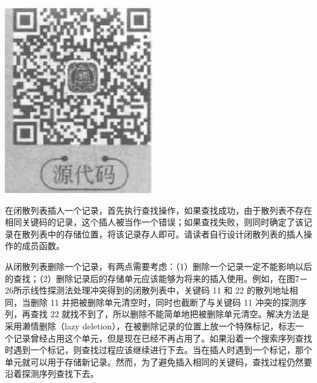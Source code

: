 \documentclass[10pt]{article}
\begin{document}
\begin{center}
\includegraphics[max width=\textwidth]{2025_06_06_704745ea57b15b2333e5g-257}
\end{center}

在闭散列表插人一个记录，首先执行查找操作，如果查找成功，由于散列表不存在相同关键码的记录，这个插人被当作一个错误；如果查找失败，则同时确定了该记录在散列表中的存储位置，将该记录存人即可。请读者自行设计闭散列表的插人操作的成员函数。

从闭散列表删除一个记录，有两点需要考虑：（1）删除一个记录一定不能影响以后的查找；（2）删除记录后的存储单元应该能够为将来的插入使用。例如，在图7－26所示线性探测法处理冲突得到的闭散列表中，关键码 11 和 22 的散列地址相同，当删除 11 并把被删除单元清空时，同时也截断了与关键码 11 冲突的探测序列，再查找 22 就找不到了，所以删除不能简单地把被删除单元清空。解决方法是采用濑情删除（lazy deletion），在被删除记录的位置上放一个特殊标记，标志一个记录曾经占用这个单元，但是现在已经不再占用了。如果沿着一个搜索序列查找时遇到一个标记，则查找过程应该继续进行下去。当在插人时遇到一个标记，那个单元就可以用于存储新记录。然而，为了避免插入相同的关键码，查找过程仍然要沿着探测序列查找下去。
\end{document}
